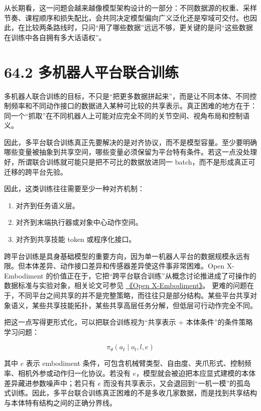 从长期看，这一问题会越来越像模型架构设计的一部分：不同数据源的权重、采样节奏、课程顺序和损失配比，会共同决定模型偏向广义泛化还是窄域可交付。也因此，在比较两条路线时，只问“用了哪些数据”远远不够，更关键的是问“这些数据在训练中各自拥有多大话语权”。

\section*{64.2 多机器人平台联合训练}


多机器人联合训练的目标，不只是“把更多数据拼起来”，而是让不同本体、不同控制频率和不同动作接口的数据进入某种可比较的共享表示。真正困难的地方在于：同一个“抓取”在不同机器人上可能对应完全不同的关节空间、视角布局和控制语义。

因此，多平台联合训练真正先要解决的是对齐协议，而不是模型容量。至少要明确哪些变量被抽象到共享空间，哪些变量必须保留为平台特有条件。若这一点没处理好，所谓联合训练就可能只是把不可比的数据放进同一 batch，而不是形成真正可迁移的跨平台先验。

因此，这类训练往往需要至少一种对齐机制：

\begin{enumerate}
\item 对齐到任务语义层。
\item 对齐到末端执行器或对象中心动作空间。
\item 对齐到共享技能 token 或程序化接口。
\end{enumerate}

跨平台训练是具身基础模型的重要方向，因为单一机器人平台的数据规模永远有限。但本体差异、动作接口差异和传感器差异使这件事非常困难。Open X-Embodiment 的价值正在于，它把“跨平台联合训练”从概念讨论推进成了可操作的数据标准与实验对象，相关论文可参见 \href{https://arxiv.org/abs/2310.08864}{《Open X-Embodiment》}。 更难的问题在于，不同平台之间共享的并不是完整策略，而往往只是部分结构。某些平台共享对象语义，某些共享技能拓扑，某些共享高层任务分解，但低层可行动作完全不同。

把这一点写得更形式化，可以把联合训练视为“共享表示 + 本体条件”的条件策略学习问题：

\begin{equation*}
\pi_\theta(a_t \mid o_t, l, e)
\end{equation*}

其中 \(e\) 表示 embodiment 条件，可包含机械臂类型、自由度、夹爪形式、控制频率、相机外参或动作归一化协议。若没有 \(e\)，模型就会被迫把本应显式建模的本体差异藏进参数噪声中；若只有 \(e\) 而没有共享表示，又会退回到“一机一模”的孤岛式训练。因此，多平台联合训练真正困难的不是多收几家数据，而是找到共享结构与本体特有结构之间的正确分界线。

